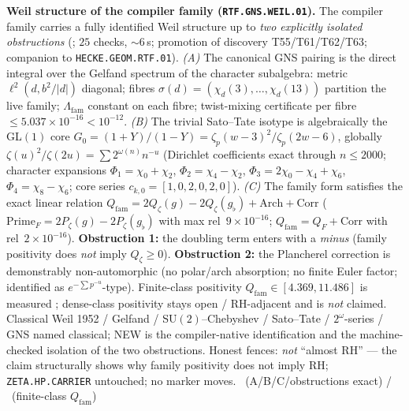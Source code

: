 \par\smallskip\noindent\textbf{Weil structure of the compiler family
(\texttt{RTF.GNS.WEIL.01}).}
The compiler family carries a fully identified Weil structure up to
\emph{two explicitly isolated obstructions}
(; $25$ checks, $\sim6$\,s; promotion of discovery
T55/T61/T62/T63; companion to \texttt{HECKE.GEOM.RTF.01}).
\emph{(A)} The canonical GNS pairing is the direct integral over the Gelfand spectrum of
the character subalgebra: metric $\ell^2(d,b^2/|d|)$ diagonal; fibres
$\sigma(d)=(\chi_d(3),\ldots,\chi_d(13))$ partition the live family; $\Lambda_{\mathrm{fam}}$
constant on each fibre; twist-mixing certificate per fibre
$\le5.037\times10^{-16}<10^{-12}$.
\emph{(B)} The trivial Sato--Tate isotype is algebraically the GL$(1)$ core
$G_0=(1+Y)/(1-Y)=\zeta_p(w-3)^2/\zeta_p(2w-6)$, globally
$\zeta(u)^2/\zeta(2u)=\sum 2^{\omega(n)}n^{-u}$ (Dirichlet coefficients exact through
$n\le2000$; character expansions
$\Phi_1=\chi_0+\chi_2$, $\Phi_2=\chi_4-\chi_2$, $\Phi_3=2\chi_0-\chi_4+\chi_6$,
$\Phi_4=\chi_8-\chi_6$; core series $c_{k,0}=[1,0,2,0,2,0]$).
\emph{(C)} The family form satisfies the exact linear relation
$Q_{\mathrm{fam}}=2Q_\zeta(g)-2Q_\zeta(g_\flat)+\mathrm{Arch}+\mathrm{Corr}$
($\mathrm{Prime}_F=2P_\zeta(g)-2P_\zeta(g_\flat)$ with max rel~$9\times10^{-16}$;
$Q_{\mathrm{fam}}=Q_F+\mathrm{Corr}$ with rel~$2\times10^{-16}$).
\textbf{Obstruction 1:} the doubling term enters with a \emph{minus}
(family positivity does \emph{not} imply $Q_\zeta\ge0$).
\textbf{Obstruction 2:} the Plancherel correction is demonstrably non-automorphic
(no polar/arch absorption; no finite Euler factor; identified as
$e^{-\sum p^{-u}}$-type).
Finite-class positivity $Q_{\mathrm{fam}}\in[4.369,11.486]$ is measured \mC;
dense-class positivity stays open / RH-adjacent and is \emph{not} claimed.
Classical Weil 1952 / Gelfand / SU$(2)$--Chebyshev / Sato--Tate / $2^\omega$-series / GNS
named classical; NEW is the compiler-native identification and the machine-checked
isolation of the two obstructions.
Honest fences: \emph{not} ``almost RH'' --- the claim structurally shows why family
positivity does not imply RH; \texttt{ZETA.HP.CARRIER} untouched; no marker moves.
\mE\ (A/B/C/obstructions exact) / \mC\ (finite-class $Q_{\mathrm{fam}}$)


